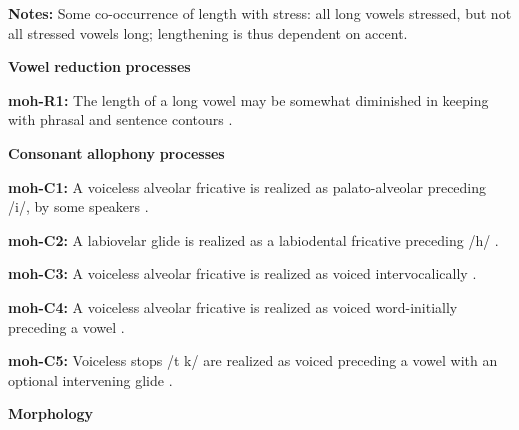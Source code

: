 \begin{styleBody}
\textbf{Notes:} Some co-occurrence of length with stress: all long vowels stressed, but not all stressed vowels long; lengthening is thus dependent on accent.
\end{styleBody}

\begin{styleBody}
\textbf{Vowel} \textbf{reduction} \textbf{processes}
\end{styleBody}

\begin{styleBody}
\textbf{moh-R1:} The length of a long vowel may be somewhat diminished in keeping with phrasal and sentence contours \citep[46]{Bonvillain1973}.
\end{styleBody}

\begin{styleBody}
\textbf{Consonant} \textbf{allophony} \textbf{processes}
\end{styleBody}

\begin{styleBody}
\textbf{moh-C1:} A voiceless alveolar fricative is realized as palato-alveolar preceding /i/, by some speakers \citep[31]{Bonvillain1973}.
\end{styleBody}

\begin{styleBody}
\textbf{moh-C2:} A labiovelar glide is realized as a labiodental fricative preceding /h/ \citep[34]{Bonvillain1973}.
\end{styleBody}

\begin{styleBody}
\textbf{moh-C3:} A voiceless alveolar fricative is realized as voiced intervocalically \citep{Bonvillain1973}.
\end{styleBody}

\begin{styleBody}
\textbf{moh-C4:} A voiceless alveolar fricative is realized as voiced word-initially preceding a vowel \citep{Bonvillain1973}.
\end{styleBody}

\begin{styleBody}
\textbf{moh-C5:} Voiceless stops /t k/ are realized as voiced preceding a vowel with an optional intervening glide \citep[28]{Bonvillain1973}.
\end{styleBody}

\begin{styleBody}
\textbf{Morphology}
\end{styleBody}


